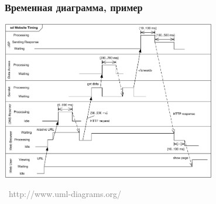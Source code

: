 \documentclass[xetex,mathserif,serif]{beamer}
\newcommand{\attribution}[1] {
	\vspace{-5mm}\begin{flushright}\begin{scriptsize}\textcolor{gray}{\textcopyright\, #1}\end{scriptsize}\end{flushright}
}
\begin{document}
	\begin{frame}
		\frametitle{Временная диаграмма, пример}
		\begin{center}
			\includegraphics[width=0.7\textwidth]{timingDiagramExample.png}
			\attribution{http://www.uml-diagrams.org/}
		\end{center}
	\end{frame}
\end{document}
